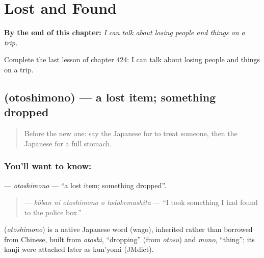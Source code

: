 
\chapter{Lost and Found}
\label{ch:ja-lost-and-found}

\begin{chapteropening}
\textbf{By the end of this chapter:} \emph{I can talk about losing people and things on a trip.}

Complete the last lesson of chapter 424: I can talk about losing people and things on a trip.
\end{chapteropening}

\section[\texorpdfstring{\ja{おとしもの} (otoshimono)}{おとしもの (otoshimono)}]{ (otoshimono) — a lost item; something dropped}

\label{lesson:JA-C424-otoshimono}



\begin{quote}
Before the new one: say the Japanese for to treat someone, then the Japanese for a full stomach.
\end{quote}

\subsection*{You'll want to know: }
\textbf{} — \emph{otoshimono} — \textquotedblleft{}a lost item; something dropped\textquotedblright{}.

\begin{quote}
\textbf{  } — \emph{kōban ni otoshimono o todokemashita} — \textquotedblleft{}I took something I had found to the police box.\textquotedblright{}
\end{quote}

\begin{cousinweb}
\textbf{} (\emph{otoshimono}) is a native Japanese word (wago), inherited rather than borrowed from Chinese, built from \emph{otoshi}, \textquotedblleft{}dropping\textquotedblright{} (from \emph{otosu}) and \emph{mono}, \textquotedblleft{}thing\textquotedblright{}; its kanji were attached later as kun'yomi (JMdict).
\end{cousinweb}

